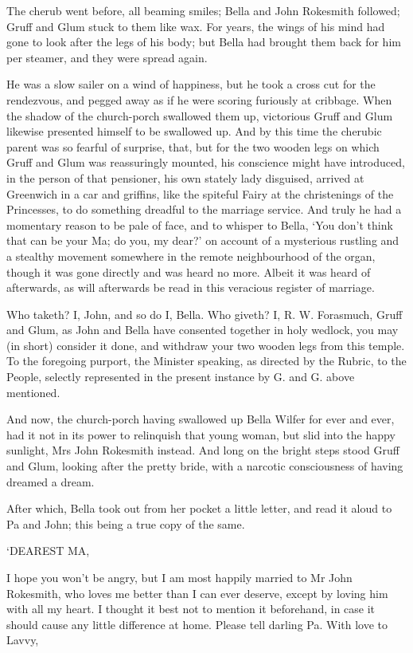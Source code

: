 The cherub went before, all beaming smiles; Bella and John Rokesmith
followed; Gruff and Glum stuck to them like wax. For years, the wings
of his mind had gone to look after the legs of his body; but Bella had
brought them back for him per steamer, and they were spread again.

He was a slow sailer on a wind of happiness, but he took a cross cut
for the rendezvous, and pegged away as if he were scoring furiously
at cribbage. When the shadow of the church-porch swallowed them up,
victorious Gruff and Glum likewise presented himself to be swallowed up.
And by this time the cherubic parent was so fearful of surprise, that,
but for the two wooden legs on which Gruff and Glum was reassuringly
mounted, his conscience might have introduced, in the person of that
pensioner, his own stately lady disguised, arrived at Greenwich in a
car and griffins, like the spiteful Fairy at the christenings of the
Princesses, to do something dreadful to the marriage service. And truly
he had a momentary reason to be pale of face, and to whisper to Bella,
‘You don’t think that can be your Ma; do you, my dear?’ on account of
a mysterious rustling and a stealthy movement somewhere in the remote
neighbourhood of the organ, though it was gone directly and was heard no
more. Albeit it was heard of afterwards, as will afterwards be read in
this veracious register of marriage.

Who taketh? I, John, and so do I, Bella. Who giveth? I, R. W. Forasmuch,
Gruff and Glum, as John and Bella have consented together in holy
wedlock, you may (in short) consider it done, and withdraw your two
wooden legs from this temple. To the foregoing purport, the Minister
speaking, as directed by the Rubric, to the People, selectly represented
in the present instance by G. and G. above mentioned.

And now, the church-porch having swallowed up Bella Wilfer for ever and
ever, had it not in its power to relinquish that young woman, but slid
into the happy sunlight, Mrs John Rokesmith instead. And long on the
bright steps stood Gruff and Glum, looking after the pretty bride, with
a narcotic consciousness of having dreamed a dream.

After which, Bella took out from her pocket a little letter, and read it
aloud to Pa and John; this being a true copy of the same.


‘DEAREST MA,

I hope you won’t be angry, but I am most happily married to Mr John
Rokesmith, who loves me better than I can ever deserve, except by loving
him with all my heart. I thought it best not to mention it beforehand,
in case it should cause any little difference at home. Please tell
darling Pa. With love to Lavvy,

